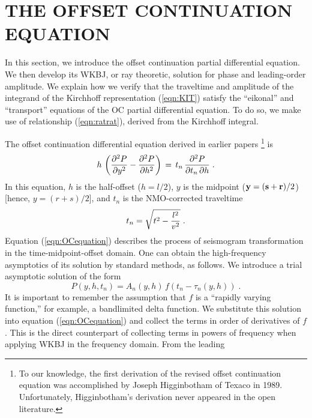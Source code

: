 \section{THE OFFSET CONTINUATION EQUATION}
In this section, we introduce the offset continuation partial
differential equation.  We then develop its WKBJ, or ray theoretic,
solution for phase and leading-order amplitude.  We explain how we
verify that the traveltime and amplitude of the integrand of the
Kirchhoff representation (\ref{eqn:KIT}) satisfy the ``eikonal'' and
``transport'' equations of the OC partial differential equation.  To
do so, we make use of relationship (\ref{eqn:ratrat}), derived from
the Kirchhoff integral.  \par The offset continuation differential
equation derived in earlier papers
\cite[]{me,GEO68-02-07180732}\footnote{To our knowledge, the first
derivation of the revised offset continuation equation was
accomplished by Joseph Higginbotham of Texaco in 1989.  Unfortunately,
Higginbotham's derivation never appeared in the open literature.} is
\begin{equation}
h \, \left( {\partial^2 P \over \partial y^2} - 
{\partial^2 P \over \partial h^2} \right) \, = \, 
t_n \, {\partial^2 P \over {\partial t_n \,\partial h}} \;. 
\label{eqn:OCequation} 
\end{equation}
In this equation, $h$ is the half-offset ($h = l/2$), $y$ is the midpoint
(${\bf y = (s + r)}/ 2$) [hence, $y = (r + s)/2$],
and $t_n$ is the NMO-corrected traveltime
\begin{equation}
t_n = \sqrt{t^2 - {{l^2} \over {v^2}}}\;.
\label{eqn:NMO}
\end{equation}
Equation (\ref{eqn:OCequation}) describes the process of
seismogram transformation in the time-midpoint-offset domain. One can
obtain the high-frequency asymptotics of its solution by standard
methods, as follows.
We introduce a trial asymptotic solution of the form
\begin{equation}
P\left(y,h,t_n\right) =
A_n(y,h)\,f\left(t_n-\tau_n(y,h)\right) \;.
\label{eqn:raymethod} 
\end{equation}
It is important to remember the assumption that $f$ is a
``rapidly varying function,'' for example, a bandlimited delta
function.
We substitute this solution
into equation (\ref{eqn:OCequation}) and collect the terms
in order of derivatives of $f$.
This is the direct counterpart of collecting terms in powers of
frequency when applying WKBJ in the frequency domain.
From the leading

